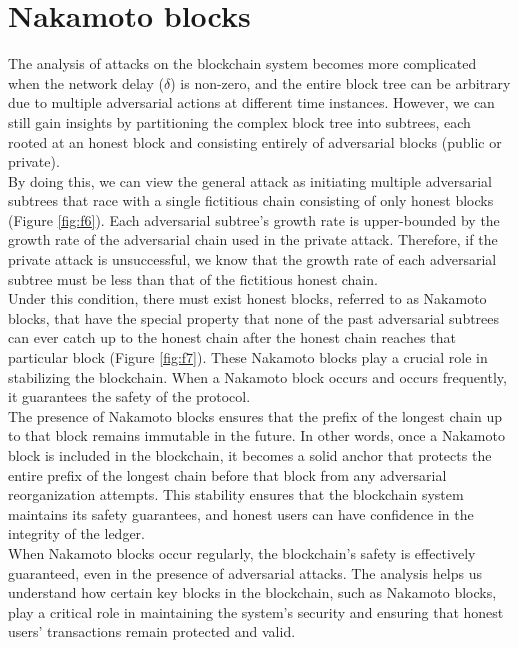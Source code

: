 \section{Nakamoto blocks}
The analysis of attacks on the blockchain system becomes more complicated when the network delay ($\delta$) is non-zero, and the entire block tree can be arbitrary due to multiple adversarial actions at different time instances. However, we can still gain insights by partitioning the complex block tree into subtrees, each rooted at an honest block and consisting entirely of adversarial blocks (public or private).\\
By doing this, we can view the general attack as initiating multiple adversarial subtrees that race with a single fictitious chain consisting of only honest blocks (Figure \ref{fig:f6}). Each adversarial subtree's growth rate is upper-bounded by the growth rate of the adversarial chain used in the private attack. Therefore, if the private attack is unsuccessful, we know that the growth rate of each adversarial subtree must be less than that of the fictitious honest chain.\\
Under this condition, there must exist honest blocks, referred to as Nakamoto blocks, that have the special property that none of the past adversarial subtrees can ever catch up to the honest chain after the honest chain reaches that particular block (Figure \ref{fig:f7}). These Nakamoto blocks play a crucial role in stabilizing the blockchain. When a Nakamoto block occurs and occurs frequently, it guarantees the safety of the protocol.\\
The presence of Nakamoto blocks ensures that the prefix of the longest chain up to that block remains immutable in the future. In other words, once a Nakamoto block is included in the blockchain, it becomes a solid anchor that protects the entire prefix of the longest chain before that block from any adversarial reorganization attempts. This stability ensures that the blockchain system maintains its safety guarantees, and honest users can have confidence in the integrity of the ledger.\\
When Nakamoto blocks occur regularly, the blockchain's safety is effectively guaranteed, even in the presence of adversarial attacks. The analysis helps us understand how certain key blocks in the blockchain, such as Nakamoto blocks, play a critical role in maintaining the system's security and ensuring that honest users' transactions remain protected and valid.

